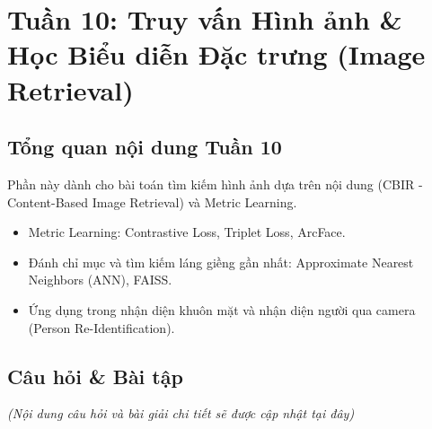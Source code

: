 \section{Tuần 10: Truy vấn Hình ảnh \& Học Biểu diễn Đặc trưng (Image Retrieval)}
\label{sec:week10}

\subsection{Tổng quan nội dung Tuần 10}
Phần này dành cho bài toán tìm kiếm hình ảnh dựa trên nội dung (CBIR - Content-Based Image Retrieval) và Metric Learning.

\begin{itemize}
    \item Metric Learning: Contrastive Loss, Triplet Loss, ArcFace.
    \item Đánh chỉ mục và tìm kiếm láng giềng gần nhất: Approximate Nearest Neighbors (ANN), FAISS.
    \item Ứng dụng trong nhận diện khuôn mặt và nhận diện người qua camera (Person Re-Identification).
\end{itemize}

\subsection{Câu hỏi \& Bài tập}
\textit{(Nội dung câu hỏi và bài giải chi tiết sẽ được cập nhật tại đây)}
